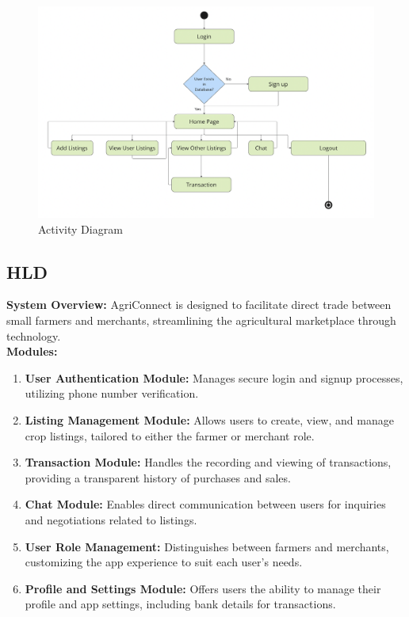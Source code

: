 \documentclass{article}
\begin{document}
\begin{figure}[]
  \centering
  \includegraphics[width=1\linewidth]{image2.png}
  \caption{Activity Diagram}
\end{figure}
\FloatBarrier
\subsection{HLD}
\textbf{System Overview:}
AgriConnect is designed to facilitate direct trade between small farmers and merchants, streamlining the agricultural marketplace through technology.\\

\textbf{Modules:}
\begin{enumerate}
    \item \textbf{User Authentication Module:} Manages secure login and signup processes, utilizing phone number verification.
    \item \textbf{Listing Management Module:} Allows users to create, view, and manage crop listings, tailored to either the farmer or merchant role.
    \item \textbf{Transaction Module:} Handles the recording and viewing of transactions, providing a transparent history of purchases and sales.
    \item \textbf{Chat Module:} Enables direct communication between users for inquiries and negotiations related to listings.
    \item \textbf{User Role Management:} Distinguishes between farmers and merchants, customizing the app experience to suit each user's needs.
    \item \textbf{Profile and Settings Module:} Offers users the ability to manage their profile and app settings, including bank details for transactions.
\end{enumerate}
\end{document}
